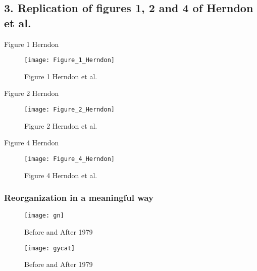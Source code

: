 \documentclass[
]{article}
\begin{document}
\hypertarget{replication-of-figures-1-2-and-4-of-herndon-et-al.}{%
\subsection{3. Replication of figures 1, 2 and 4 of Herndon et
al.~}\label{replication-of-figures-1-2-and-4-of-herndon-et-al.}}

Figure 1 Herndon

\begin{figure}
\texttt{[image: Figure\_1\_Herndon]} \caption{Figure 1 Herndon et al.}\label{fig:unnamed-chunk-14}
\end{figure}

Figure 2 Herndon

\begin{figure}
\texttt{[image: Figure\_2\_Herndon]} \caption{Figure 2 Herndon et al.}\label{fig:unnamed-chunk-15}
\end{figure}

Figure 4 Herndon

\begin{figure}
\texttt{[image: Figure\_4\_Herndon]} \caption{Figure 4 Herndon et al.}\label{fig:unnamed-chunk-16}
\end{figure}

\hypertarget{reorganization-in-a-meaningful-way}{%
\subsubsection{Reorganization in a meaningful
way}\label{reorganization-in-a-meaningful-way}}

\begin{figure}
\texttt{[image: gn]} \caption{Before and After 1979}\label{fig:unnamed-chunk-17}
\end{figure}

\begin{figure}
\texttt{[image: gycat]} \caption{Before and After 1979}\label{fig:unnamed-chunk-18}
\end{figure}
\end{document}
